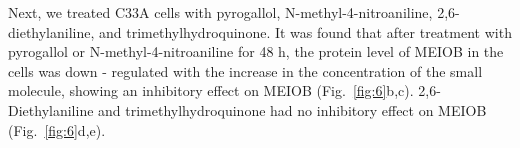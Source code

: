 \documentclass[preprint,12pt]{elsarticle}
\theoremstyle{plain}
\theoremstyle{definition}
\theoremstyle{remark}
\begin{document}
Next, we treated C33A cells with pyrogallol, N-methyl-4-nitroaniline, 2,6-diethylaniline, and trimethylhydroquinone. It was found that after treatment with pyrogallol or N-methyl-4-nitroaniline for 48 h, the protein level of MEIOB in the cells was down - regulated with the increase in the concentration of the small molecule, showing an inhibitory effect on MEIOB (Fig.~\ref{fig:6}b,c). 2,6-Diethylaniline and trimethylhydroquinone had no inhibitory effect on MEIOB (Fig.~\ref{fig:6}d,e).




\end{document}
